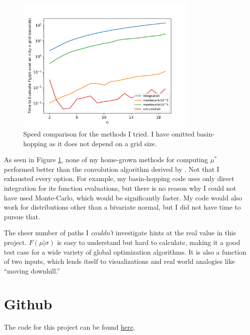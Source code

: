 \documentclass[]{article}
\begin{document}
\begin{figure}[h]
	\centering
	\includegraphics[width=0.8\textwidth]{../images/timing.png}
	\caption{Speed comparison for the methods I tried. I have omitted basin-hopping as it does not depend on a grid size.}
	\label{fig:time}
\end{figure}

As seen in Figure \ref{fig:time}, none of my home-grown methods for computing $\mu^*$ performed better than the convolution algorithm derived by \citeauthor{stat}.  Not that I exhausted every option. For example, my basin-hopping code uses only direct integration for its function evaluations, but there is no reason why I could not have used Monte-Carlo, which would be significantly faster. My code would also work for distributions other than a bivariate normal, but I did not have time to pursue that.

The sheer number of paths I \emph{couldn't} investigate hints at the real value in this project. $F(\mu \vert \sigma)$ is easy to understand but hard to calculate, making it a good test case for a wide variety of global optimization algorithms. It is also a function of two inputs, which lends itself to visualizations and real world analogies like ``moving downhill.''

\section{Github}
The code for this project can be found \href{https://github.com/mac15max15/darts/}{here}.




\printbibliography
\end{document}
